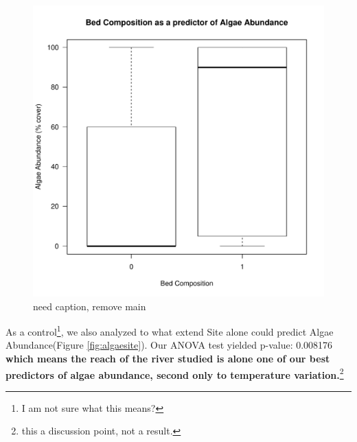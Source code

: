 \documentclass{article}\usepackage[]{graphicx}\usepackage[]{color}
\makeatletter
\def\maxwidth{ %
  \ifdim\Gin@nat@width>\linewidth
    \linewidth
  \else
    \Gin@nat@width
  \fi
}
\newenvironment{knitrout}{}{} %
\makeatother
\begin{document}
\begin{figure}[!ht]
\begin{knitrout}
\color{fgcolor}
\includegraphics[width=\maxwidth]{figure/unnamed-chunk-3-1} 

\end{knitrout}
\caption{need caption, remove main}
\label{fig:algaesediment}
\end{figure}


As a control\footnote{I am not sure what this means?}, we also analyzed to what extend Site alone could predict Algae Abundance(Figure \ref{fig:algaesite}). Our ANOVA test yielded p-value: 0.008176 \textbf{which means the reach of the river studied is alone one of our best predictors of algae abundance, second only to temperature variation.}\footnote{this a discussion point, not a result.} 
\end{document}
